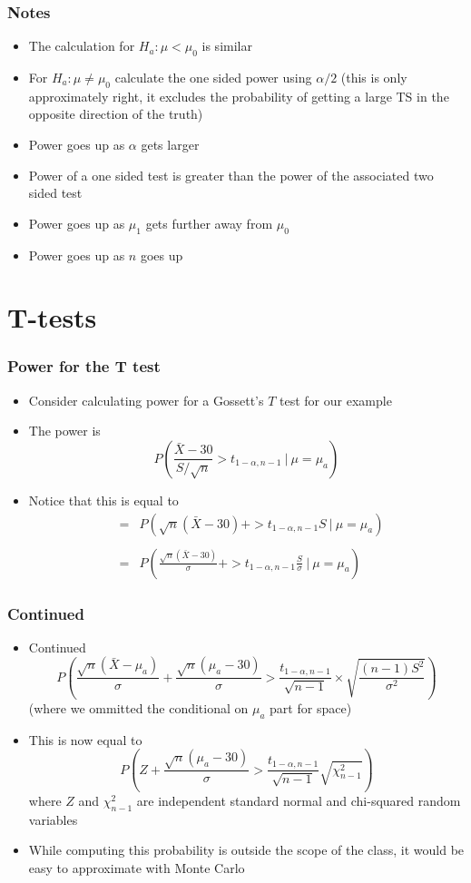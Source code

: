 \documentclass[aspectratio=169]{beamer}
\begin{document}
\begin{frame}\frametitle{Notes}
\begin{itemize}
\item The calculation for $H_a:\mu < \mu_0$ is similar
\item For $H_a: \mu \neq \mu_0$ calculate the one sided power using
  $\alpha / 2$ (this is only approximately right, it excludes the probability of
  getting a large TS in the opposite direction of the truth)
\item Power goes up as $\alpha$ gets larger
\item Power of a one sided test is greater than the power of the
  associated two sided test
\item Power goes up as $\mu_1$ gets further away from $\mu_0$
\item Power goes up as $n$ goes up
\end{itemize}
\end{frame}


\section{T-tests}
\begin{frame}\frametitle{Power for the T test}
\begin{itemize}
\item Consider calculating power for a Gossett's $T$ test for our example
\item The power is
  $$
  P\left(\frac{\bar X - 30}{S /\sqrt{n}} > t_{1-\alpha, n-1} ~|~ \mu = \mu_a \right)
  $$
\item Notice that this is equal to
  \begin{eqnarray*}
& = &     
  P\left(\sqrt{n}(\bar X - 30) +  > t_{1 - \alpha, n-1} S ~|~ \mu = \mu_a \right)\\ \\
& = &     
  P\left(\frac{\sqrt{n}(\bar X - 30)}{\sigma} +  > t_{1-\alpha, n-1} \frac{S}{\sigma} ~|~ \mu = \mu_a \right)
  \end{eqnarray*}
\end{itemize}
\end{frame}

\begin{frame}\frametitle{Continued}
\begin{itemize}
\item Continued
$$
  P\left(\frac{\sqrt{n}(\bar X - \mu_a)}{\sigma} + \frac{\sqrt{n}(\mu_a - 30)}{\sigma} > \frac{t_{1-\alpha, n-1}}{\sqrt{n-1}}\times \sqrt{\frac{(n-1) S^2}{\sigma^2}} \right)$$
(where we ommitted the conditional on $\mu_a$ part for space)
\item This is now equal to
$$
P\left(Z + \frac{\sqrt{n}(\mu_a - 30)}{\sigma} >  \frac{t_{1 - \alpha, n-1}}{\sqrt{n-1}} \sqrt{\chi^2_{n-1}}\right)
$$
where $Z$ and $\chi^2_{n-1}$ are independent standard normal and chi-squared random variables
\item While computing this probability is outside the scope of the class, it would be easy to approximate with Monte Carlo
\end{itemize}
\end{frame}
\end{document}
